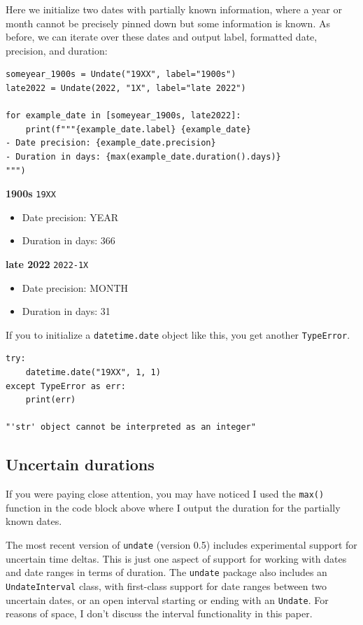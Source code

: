 \documentclass[final]{anthology-ch} %
\begin{document}
Here we initialize two dates with partially known information, where a year or month cannot be precisely pinned down but some information is known. As before, we can iterate over these dates and output label, formatted date, precision, and duration:

\begin{verbatim}
someyear_1900s = Undate("19XX", label="1900s")
late2022 = Undate(2022, "1X", label="late 2022")

for example_date in [someyear_1900s, late2022]:
    print(f"""{example_date.label} {example_date}
- Date precision: {example_date.precision}
- Duration in days: {max(example_date.duration().days)}
""")
\end{verbatim}

\noindent
\textbf{1900s} \texttt{19XX}
\begin{itemize}
    \item Date precision: YEAR
    \item Duration in days: 366
\end{itemize}
    
\noindent
\textbf{late 2022} \texttt{2022-1X}
\begin{itemize}
    \item Date precision: MONTH
    \item Duration in days: 31
\end{itemize}    

If you to initialize a \texttt{datetime.date} object like this, you get another \texttt{TypeError}.    

\begin{verbatim}
try:
    datetime.date("19XX", 1, 1)
except TypeError as err:
    print(err)

"'str' object cannot be interpreted as an integer"
\end{verbatim}

\subsection{Uncertain durations}

If you were paying close attention, you may have noticed I used the \texttt{max()} function in the code block above where I output the duration for the partially known dates.

The most recent version of \texttt{undate} (version 0.5) includes experimental support for uncertain time deltas.  This is just one aspect of support for working with dates and date ranges in terms of duration.  The \texttt{undate} package also includes an \texttt{UndateInterval} class, with first-class support for date ranges between two uncertain dates, or an open interval starting or ending with an \texttt{Undate}. For reasons of space, I don't discuss the interval functionality in this paper.
\end{document}
